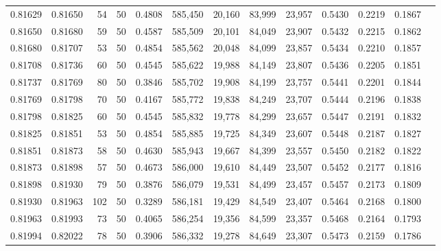 \begin{tabular}{rrrrrrrrrrrrr}
0.81629 & 0.81650 &    54 &  50 &                                     0.4808 & 585,450 &  20,160 &  83,999 &  23,957 & 0.5430 & 0.2219 & 0.1867 \\
0.81650 & 0.81680 &    59 &  50 &                                     0.4587 & 585,509 &  20,101 &  84,049 &  23,907 & 0.5432 & 0.2215 & 0.1862 \\
0.81680 & 0.81707 &    53 &  50 &                                     0.4854 & 585,562 &  20,048 &  84,099 &  23,857 & 0.5434 & 0.2210 & 0.1857 \\
0.81708 & 0.81736 &    60 &  50 &                                     0.4545 & 585,622 &  19,988 &  84,149 &  23,807 & 0.5436 & 0.2205 & 0.1851 \\
0.81737 & 0.81769 &    80 &  50 &                                     0.3846 & 585,702 &  19,908 &  84,199 &  23,757 & 0.5441 & 0.2201 & 0.1844 \\
0.81769 & 0.81798 &    70 &  50 &                                     0.4167 & 585,772 &  19,838 &  84,249 &  23,707 & 0.5444 & 0.2196 & 0.1838 \\
0.81798 & 0.81825 &    60 &  50 &                                     0.4545 & 585,832 &  19,778 &  84,299 &  23,657 & 0.5447 & 0.2191 & 0.1832 \\
0.81825 & 0.81851 &    53 &  50 &                                     0.4854 & 585,885 &  19,725 &  84,349 &  23,607 & 0.5448 & 0.2187 & 0.1827 \\
0.81851 & 0.81873 &    58 &  50 &                                     0.4630 & 585,943 &  19,667 &  84,399 &  23,557 & 0.5450 & 0.2182 & 0.1822 \\
0.81873 & 0.81898 &    57 &  50 &                                     0.4673 & 586,000 &  19,610 &  84,449 &  23,507 & 0.5452 & 0.2177 & 0.1816 \\
0.81898 & 0.81930 &    79 &  50 &                                     0.3876 & 586,079 &  19,531 &  84,499 &  23,457 & 0.5457 & 0.2173 & 0.1809 \\
0.81930 & 0.81963 &   102 &  50 &                                     0.3289 & 586,181 &  19,429 &  84,549 &  23,407 & 0.5464 & 0.2168 & 0.1800 \\
0.81963 & 0.81993 &    73 &  50 &                                     0.4065 & 586,254 &  19,356 &  84,599 &  23,357 & 0.5468 & 0.2164 & 0.1793 \\
0.81994 & 0.82022 &    78 &  50 &                                     0.3906 & 586,332 &  19,278 &  84,649 &  23,307 & 0.5473 & 0.2159 & 0.1786 \\

\end{tabular}
